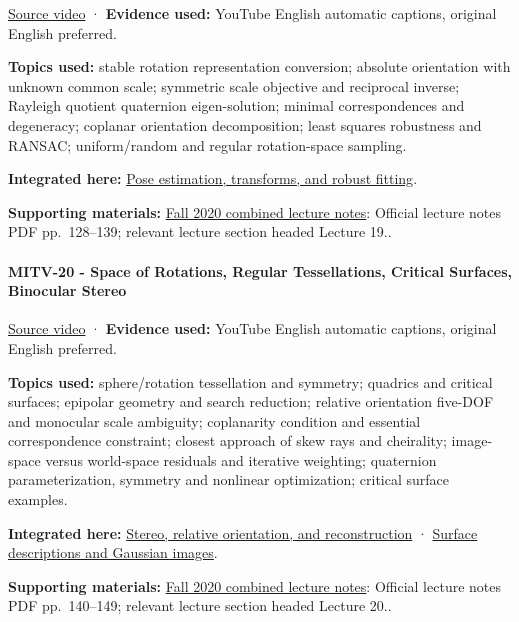 \href{https://www.youtube.com/watch?v=kigLhcTm_gg}{Source video} · \textbf{Evidence used:} YouTube English automatic captions, original English preferred.

\textbf{Topics used:} stable rotation representation conversion; absolute orientation with unknown common scale; symmetric scale objective and reciprocal inverse; Rayleigh quotient quaternion eigen-solution; minimal correspondences and degeneracy; coplanar orientation decomposition; least squares robustness and RANSAC; uniform/random and regular rotation-space sampling.

\textbf{Integrated here:} \hyperref[04-visual-computing-ii-ch032]{Pose estimation, transforms, and robust fitting}.

\textbf{Supporting materials:} \href{https://ocw.mit.edu/courses/6-801-machine-vision-fall-2020/9ec44f69e72995c370b3797818ba01e6_MIT6_801F20_lectureNotes.pdf}{Fall 2020 combined lecture notes}: Official lecture notes PDF pp.~128--139; relevant lecture section headed Lecture 19..

\paragraph{MITV-20 - Space of Rotations, Regular Tessellations, Critical Surfaces, Binocular Stereo}\label{mitv-20---space-of-rotations-regular-tessellations-critical-surfaces-binocular-stereo}

\href{https://www.youtube.com/watch?v=Mcy-LlcD8jI}{Source video} · \textbf{Evidence used:} YouTube English automatic captions, original English preferred.

\textbf{Topics used:} sphere/rotation tessellation and symmetry; quadrics and critical surfaces; epipolar geometry and search reduction; relative orientation five-DOF and monocular scale ambiguity; coplanarity condition and essential correspondence constraint; closest approach of skew rays and cheirality; image-space versus world-space residuals and iterative weighting; quaternion parameterization, symmetry and nonlinear optimization; critical surface examples.

\textbf{Integrated here:} \hyperref[04-visual-computing-ii-ch032]{Stereo, relative orientation, and reconstruction} · \hyperref[04-visual-computing-ii-ch032]{Surface descriptions and Gaussian images}.

\textbf{Supporting materials:} \href{https://ocw.mit.edu/courses/6-801-machine-vision-fall-2020/9ec44f69e72995c370b3797818ba01e6_MIT6_801F20_lectureNotes.pdf}{Fall 2020 combined lecture notes}: Official lecture notes PDF pp.~140--149; relevant lecture section headed Lecture 20..

